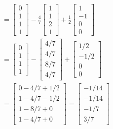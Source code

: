 \begin{align*}
                                & = \begin{bmatrix} 0 \\ 1 \\ 1 \\ 1 \end{bmatrix} - \frac{4}{7} \begin{bmatrix} 1 \\ 1 \\ 2 \\ 1 \end{bmatrix} + \frac{1}{2} \begin{bmatrix} 1 \\ -1 \\ 0 \\ 0 \end{bmatrix}                                                                               \\
                                & = \begin{bmatrix} 0 \\ 1 \\ 1 \\ 1 \end{bmatrix} - \begin{bmatrix} 4/7 \\ 4/7 \\ 8/7 \\ 4/7 \end{bmatrix} + \begin{bmatrix} 1/2 \\ -1/2 \\ 0 \\ 0 \end{bmatrix}                                                                                           \\
                                & = \begin{bmatrix} 0 - 4/7 + 1/2 \\ 1 - 4/7 - 1/2 \\ 1 - 8/7 + 0 \\ 1 - 4/7 + 0 \end{bmatrix} = \begin{bmatrix} -1/14 \\ -1/14 \\ -1/7 \\ 3/7 \end{bmatrix}
\end{align*}


